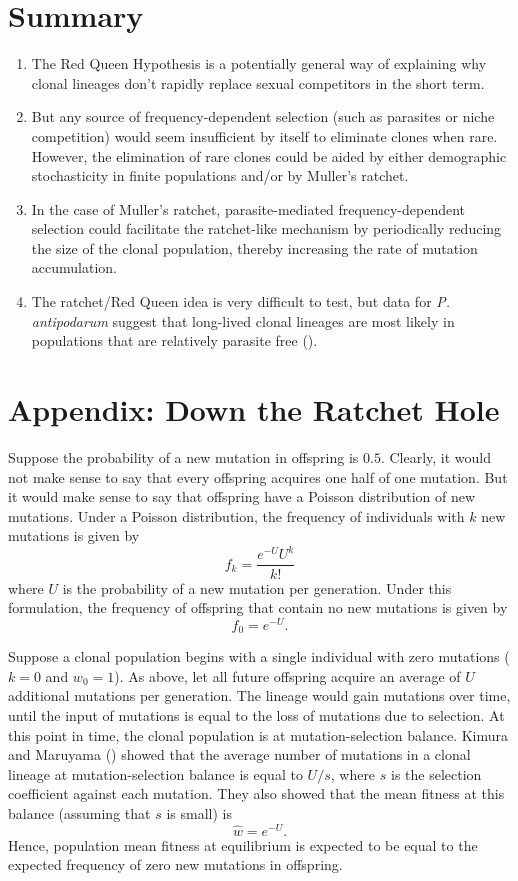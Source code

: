 \documentclass[
  letterpaper,
]{book}
\providecommand{\tightlist}{%
  \setlength{\itemsep}{0pt}\setlength{\parskip}{0pt}}\usepackage{longtable,booktabs,array}
\begin{document}
\section{Summary}\label{summary-4}

\begin{enumerate}
\def\labelenumi{\arabic{enumi}.}
\tightlist
\item
  The Red Queen Hypothesis is a potentially general way of explaining
  why clonal lineages don't rapidly replace sexual competitors in the
  short term.
\item
  But any source of frequency-dependent selection (such as parasites or
  niche competition) would seem insufficient by itself to eliminate
  clones when rare. However, the elimination of rare clones could be
  aided by either demographic stochasticity in finite populations and/or
  by Muller's ratchet.
\item
  In the case of Muller's ratchet, parasite-mediated frequency-dependent
  selection could facilitate the ratchet-like mechanism by periodically
  reducing the size of the clonal population, thereby increasing the
  rate of mutation accumulation.
\item
  The ratchet/Red Queen idea is very difficult to test, but data for
  \emph{P. antipodarum} suggest that long-lived clonal lineages are most
  likely in populations that are relatively parasite free
  ().
\end{enumerate}

\section{Appendix: Down the Ratchet Hole}\label{sec-app-6}

Suppose the probability of a new mutation in offspring is \(0.5\).
Clearly, it would not make sense to say that every offspring acquires
one half of one mutation. But it would make sense to say that offspring
have a Poisson distribution of new mutations. Under a Poisson
distribution, the frequency of individuals with \(k\) new mutations is
given by \[f_k=\frac{e^{-U}U^k}{k!}\] where \(U\) is the probability of
a new mutation per generation. Under this formulation, the frequency of
offspring that contain no new mutations is given by \[f_0=e^{-U}.\]

Suppose a clonal population begins with a single individual with zero
mutations (\(k = 0\) and \(w_0 = 1\)). As above, let all future
offspring acquire an average of \(U\) additional mutations per
generation. The lineage would gain mutations over time, until the input
of mutations is equal to the loss of mutations due to selection. At this
point in time, the clonal population is at mutation-selection balance.
Kimura and Maruyama () showed that the
average number of mutations in a clonal lineage at mutation-selection
balance is equal to \(U/s\), where \(s\) is the selection coefficient
against each mutation. They also showed that the mean fitness at this
balance (assuming that \(s\) is small) is \[\hat{w}=e^{-U}.\] Hence,
population mean fitness at equilibrium is expected to be equal to the
expected frequency of zero new mutations in offspring.
\end{document}
